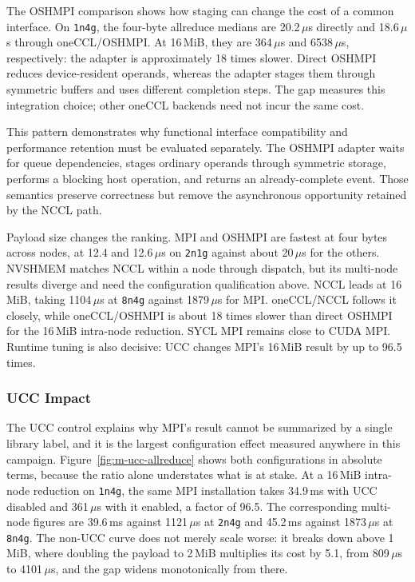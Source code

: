 \begin{table}[htbp]
\centering
\caption[Peak \texttt{allreduce} bus bandwidth]{Peak \texttt{allreduce} bus bandwidth in GB/s, recomputed as input bytes divided by allocation-median latency and multiplied by $2(P-1)/P$.}
\label{tab:m-allreduce-bandwidth}

\end{table}

The OSHMPI comparison shows how staging can change the cost of a common interface. On \texttt{1n4g}, the four-byte allreduce medians are 20.2\,$\mu$s directly and 18.6\,$\mu$s through oneCCL/OSHMPI. At 16\,MiB, they are 364\,$\mu$s and 6538\,$\mu$s, respectively: the adapter is approximately 18 times slower. Direct OSHMPI reduces device-resident operands, whereas the adapter stages them through symmetric buffers and uses different completion steps. The gap measures this integration choice; other oneCCL backends need not incur the same cost.

This pattern demonstrates why functional interface compatibility and performance retention must be evaluated separately. The OSHMPI adapter waits for queue dependencies, stages ordinary operands through symmetric storage, performs a blocking host operation, and returns an already-complete event. Those semantics preserve correctness but remove the asynchronous opportunity retained by the NCCL path.

\begin{keypoint}
Payload size changes the ranking. MPI and OSHMPI are fastest at four bytes across nodes, at 12.4 and 12.6\,$\mu$s on \texttt{2n1g} against about 20\,$\mu$s for the others. NVSHMEM matches NCCL within a node through dispatch, but its multi-node results diverge and need the configuration qualification above. NCCL leads at 16\,MiB, taking 1104\,$\mu$s at \texttt{8n4g} against 1879\,$\mu$s for MPI. oneCCL/NCCL follows it closely, while oneCCL/OSHMPI is about 18 times slower than direct OSHMPI for the 16\,MiB intra-node reduction. SYCL MPI remains close to CUDA MPI. Runtime tuning is also decisive: UCC changes MPI's 16\,MiB result by up to 96.5 times.
\end{keypoint}

\subsubsection{UCC Impact}

The UCC control explains why MPI's result cannot be summarized by a single library label, and it is the largest configuration effect measured anywhere in this campaign. Figure~\ref{fig:m-ucc-allreduce} shows both configurations in absolute terms, because the ratio alone understates what is at stake. At a 16\,MiB intra-node reduction on \texttt{1n4g}, the same MPI installation takes 34.9\,ms with UCC disabled and 361\,$\mu$s with it enabled, a factor of 96.5. The corresponding multi-node figures are 39.6\,ms against 1121\,$\mu$s at \texttt{2n4g} and 45.2\,ms against 1873\,$\mu$s at \texttt{8n4g}. The non-UCC curve does not merely scale worse: it breaks down above 1\,MiB, where doubling the payload to 2\,MiB multiplies its cost by 5.1, from 809\,$\mu$s to 4101\,$\mu$s, and the gap widens monotonically from there.

